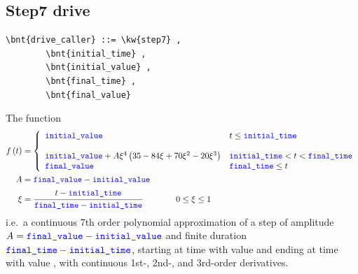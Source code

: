 \subsection{Step7 drive}
\begin{Verbatim}[commandchars=\\\{\}]
    \bnt{drive_caller} ::= \kw{step7} ,
        \bnt{initial_time} , 
        \bnt{initial_value} ,
        \bnt{final_time} ,
        \bnt{final_value}
\end{Verbatim}    
The function
\begin{align}
	f\plbr{t} &= 
	\lcubr{\matr{ll}{
		\nt{initial\_value} %
			& t \le \nt{initial\_time} \\
		\\
		\nt{initial\_value} + A \xi^4 \plbr{35 - 84 \xi + 70 \xi^2 - 20 \xi^3}
			& \nt{initial\_time} < t < \nt{final\_time}
		\\
		\nt{final\_value}
			& \nt{final\_time} \le t \\
	}}
	\\
	A &= \nt{final\_value} - \nt{initial\_value}
	\nonumber \\
	\xi &= \cfrac{t - \nt{initial\_time}}{\nt{final\_time} - \nt{initial\_time}}
	\hspace{40pt} 0 \le \xi \le 1
	\nonumber 
\end{align}
i.e.\ a continuous 7th order polynomial approximation of a step of amplitude $A = \textcolor{blue}{\texttt{final\_value}} - \textcolor{blue}{\texttt{initial\_value}}$
and finite duration $\textcolor{blue}{\texttt{final\_time}} - \textcolor{blue}{\texttt{initial\_time}}$,
starting at time  with value  and ending at time  with value ,
with continuous 1st-, 2nd-, and 3rd-order derivatives.

